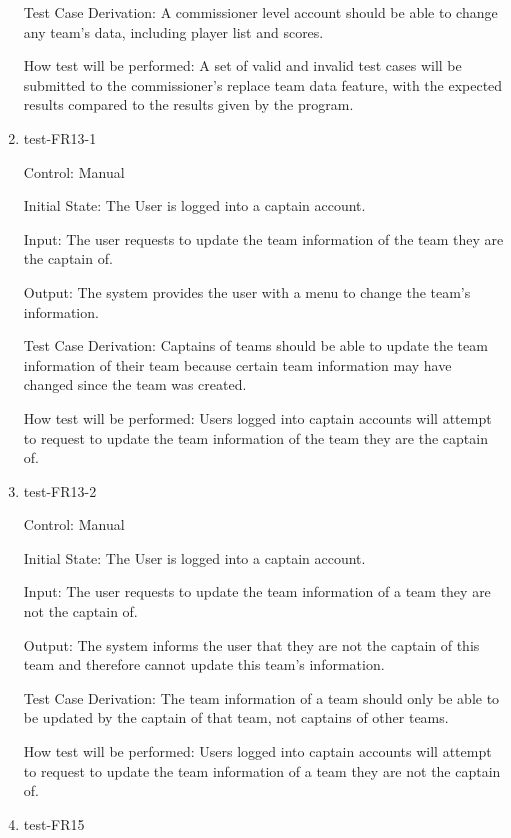 \documentclass[12pt, titlepage]{article}
\begin{document}
\begin{enumerate}
  Test Case Derivation: A commissioner level account should be able to change
  any team's data, including player list and scores.

  How test will be performed: A set of valid and invalid test cases will be
  submitted to the commissioner's replace team data feature, with the expected
  results compared to the results given by the program.

  \item{test-FR13-1\\}

  Control: Manual
           
  Initial State: The User is logged into a captain account.
           
  Input: The user requests to update the team information of the team they are
  the captain of.
           
  Output: The system provides the user with a menu to change the team's
  information.
 
  Test Case Derivation: Captains of teams should be able to update the team
  information of their team because certain team information may have changed
  since the team was created.
 
  How test will be performed: Users logged into captain accounts will attempt
  to request to update the team information of the team they are the captain of.

\item{test-FR13-2\\}

  Control: Manual
           
  Initial State: The User is logged into a captain account.
           
  Input: The user requests to update the team information of a team they are
  not the captain of.
           
  Output: The system informs the user that they are not the captain of this team
  and therefore cannot update this team's information.
 
  Test Case Derivation: The team information of a team should only be able to be
  updated by the captain of that team, not captains of other teams.
 
  How test will be performed: Users logged into captain accounts will attempt
  to request to update the team information of a team they are not the captain
  of.

  \item{test-FR15\\}


\end{enumerate}
\end{document}
